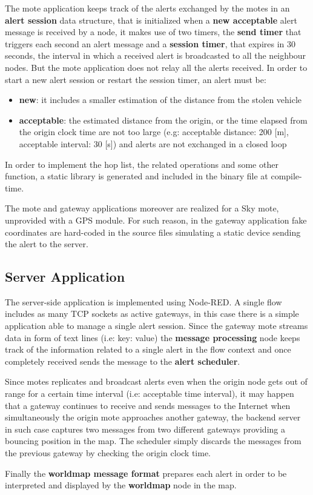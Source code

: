 \documentclass[]{article}
\begin{document}
The mote application keeps track of the alerts exchanged by the motes in an \textbf{alert session} data structure, that is initialized when a \textbf{new acceptable} alert message is received by a node, it makes use of two timers, the \textbf{send timer} that triggers each second an alert message and a \textbf{session timer}, that expires in 30 seconds, the interval in which a received alert is broadcasted to all the neighbour nodes. But the mote application does not relay all the alerts received. In order to start a new alert session or restart the session timer, an alert must be:
\begin{itemize}
	\item \textbf{new}: it includes a smaller estimation of the distance from the stolen vehicle 
	\item \textbf{acceptable}: the estimated distance from the origin, or the time elapsed from the origin clock time are not too large (e.g: acceptable distance: 200 [m], acceptable interval: 30 [s]) and alerts are not exchanged in a closed loop
\end{itemize}
In order to implement the hop list, the related operations and some other function, a static library is generated and included in the binary file at compile-time. \par 
The mote and gateway applications moreover are realized for a Sky mote, unprovided with a GPS module. For such reason, in the gateway application fake coordinates are hard-coded in the source files simulating a static device sending the alert to the server. 

\subsection{Server Application}
The server-side application is implemented using Node-RED. A single flow includes as many TCP sockets as active gateways, in this case there is a simple application able to manage a single alert session. Since the gateway mote streams data in form of text lines (i.e: key: value) the \textbf{message processing} node keeps track of the information related to a single alert in the flow context and once completely received sends the message to the \textbf{alert scheduler}.\par Since motes replicates and broadcast alerts even when the origin node gets out of range for a certain time interval (i.e: acceptable time interval), it may happen that a gateway continues to receive and sends messages to the Internet when simultaneously the origin mote approaches another gateway, the backend server in such case captures two messages from two different gateways providing a bouncing position in the map. The scheduler simply discards the messages from the previous gateway by checking the origin clock time.\par
Finally the \textbf{worldmap message format} prepares each alert in order to be interpreted and displayed by the \textbf{worldmap} node in the map.
\end{document}
